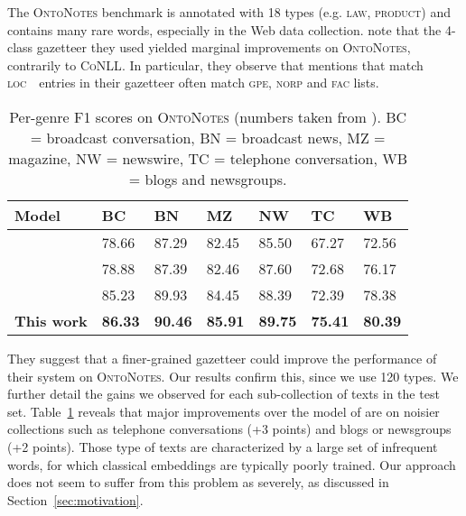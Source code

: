 \documentclass[11pt]{article}
\newcommand{\conll}{\textsc{CoNLL}}
\newcommand{\onto}{\textsc{OntoNotes}}
\newcommand{\loc}{\textsc{loc}}
\newcommand{\gpe}{\textsc{gpe}}
\newcommand{\norp}{\textsc{norp}}
\newcommand{\fac}{\textsc{fac}}
\begin{document}
	The \onto{} benchmark  is annotated with 18 types (e.g. \textsc{law}, \textsc{product}) and  contains many rare words, especially in the Web data collection.  note that the 4-class gazetteer they used  yielded marginal improvements on \onto{}, contrarily to \conll. In particular, they observe that mentions that match \loc{~} entries in their gazetteer often match  \gpe, \norp{} and \fac{} lists.  
	
	\begin{table}[!h]
		\setlength{\tabcolsep}{2mm} 
		\begin{center}
			\begin{tabular}{|l|l|l|l|l|l|l|}
				\hline \bf Model & \bf BC & \bf BN & \bf MZ & \bf NW & \bf TC  & \bf WB \\
				\hline
				\cite{finkel2009joint} & 78.66 & 87.29 & 82.45 & 85.50 & 67.27 & 72.56 \\
				\cite{durrett2014joint} & 78.88 & 87.39 & 82.46 & 87.60 & 72.68 & 76.17 \\
				\cite{chiu2015named} & 85.23 & 89.93 & 84.45 & 88.39 & 72.39 & 78.38 \\
				\hline
				\textbf{This work} & \bf 86.33 & \bf 90.46 & \bf 85.91 & \bf 89.75 & \bf 75.41 & \bf 80.39 \\
				\hline
			\end{tabular}
		\end{center}
		
		\caption{Per-genre F1 scores on \onto{} (numbers taken from ). BC = broadcast conversation, BN = broadcast news, MZ = magazine, NW = newswire, TC = telephone conversation, WB = blogs and newsgroups.}
		\label{tab:onto.genre} 
		
	\end{table}	
	
	
	They suggest that a finer-grained gazetteer could improve the performance of their system on \onto. Our results confirm this, since we use 120 types. We further detail the gains we observed for each sub-collection of texts in the test set. Table~\ref{tab:onto.genre} reveals that major improvements over the model of \cite{chiu2015named} are on noisier collections such as telephone conversations (+3 points) and blogs or newsgroups (+2 points). Those type of texts are characterized by a large set of infrequent words, for which classical embeddings are typically poorly trained. Our approach does not seem to suffer from this problem as severely, as discussed in Section~\ref{sec:motivation}. 
	
\end{document}
